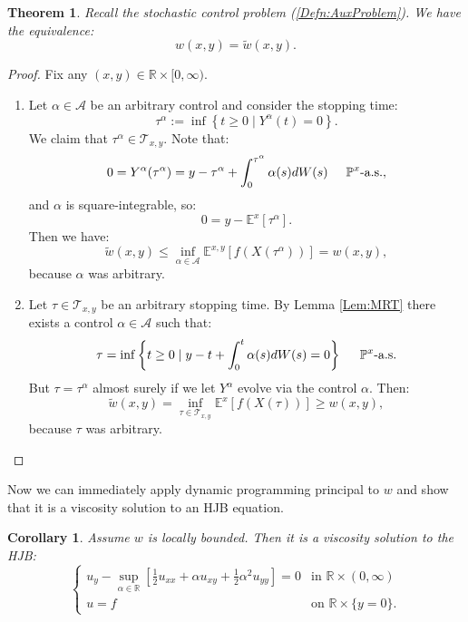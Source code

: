 \documentclass[11pt]{article}
\newtheorem{cor}{Corollary}
\newtheorem{thm}{Theorem}
\begin{document}
\begin{thm}Recall the stochastic control problem (\ref{Defn:AuxProblem}). We have the equivalence:
\[w(x,y) = \tilde{w}(x,y).\]\end{thm}
\begin{proof}
Fix any $(x,y)\in\mathbb{R}\times [0,\infty)$.
\begin{enumerate}
\item Let $\alpha\in\mathcal{A}$ be an arbitrary control and consider the stopping time:
\[\tau^\alpha := \inf\left\{t\geq 0\mid Y^\alpha(t)=0\right\}.\]
We claim that $\tau^\alpha\in\mathcal{T}_{x,y}$. Note that:
\[0=Y^\alpha(\tau^\alpha)=y-\tau^\alpha+\int_0^{\tau^\alpha}\alpha(s)dW(s)\hspace*{0.5cm}\mathbb{P}^x\text{-a.s.},\]
and $\alpha$ is square-integrable, so:
\[0 = y - \mathbb{E}^x\left[\tau^\alpha\right].\]
Then we have:
\[\tilde{w}(x,y)\leq\inf\limits_{\alpha\in\mathcal{A}}\mathbb{E}^{x,y}\left[f(X(\tau^\alpha))\right] = w(x,y),\]
because $\alpha$ was arbitrary.

\item Let $\tau\in\mathcal{T}_{x,y}$ be an arbitrary stopping time. By Lemma \ref{Lem:MRT} there exists a control $\alpha\in\mathcal{A}$ such that:
\[\tau = \inf\left\{t\geq 0\mid y-t+\int_0^t\alpha(s)dW(s)=0\right\}\hspace*{0.5cm}\mathbb{P}^x\text{-a.s.}\]
But $\tau=\tau^\alpha$ almost surely if we let $Y^\alpha$ evolve via the control $\alpha$. Then:
\[\tilde{w}(x,y)=\inf\limits_{\tau\in\mathcal{T}_{x,y}}\mathbb{E}^x\left[f(X(\tau))\right]\geq w(x,y),\]
because $\tau$ was arbitrary.
\end{enumerate}
\end{proof}

Now we can immediately apply dynamic programming principal to $w$ and show that it is a viscosity solution to an HJB equation.

\begin{cor}\label{Cor:ViscositySolution}
Assume $w$ is locally bounded. Then it is a viscosity solution to the HJB:
\begin{equation}\label{Eqn:AuxiliaryHJB}
\left\{\begin{array}{rl}
u_y - \sup\limits_{\alpha\in\mathbb{R}}\left[\frac{1}{2}u_{xx}+\alpha u_{xy}+\frac{1}{2}\alpha^2 u_{yy}\right] = 0 & \text{in }\mathbb{R}\times(0,\infty)\\
u = f & \text{on }\mathbb{R}\times\{y=0\}.
\end{array}\right.\end{equation}\end{cor}
\end{document}

